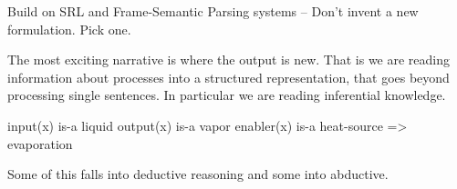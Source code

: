 Build on SRL and Frame-Semantic Parsing systems 
	-- Don't invent a new formulation. Pick one.
	
	

The most exciting narrative is where the output is new. That is we are reading information about processes into a structured representation, that goes beyond processing single sentences. In particular we are reading inferential knowledge. 

input(x) is-a liquid
output(x) is-a vapor
enabler(x) is-a heat-source
	=> evaporation
	
Some of this falls into deductive reasoning and some into abductive.

	